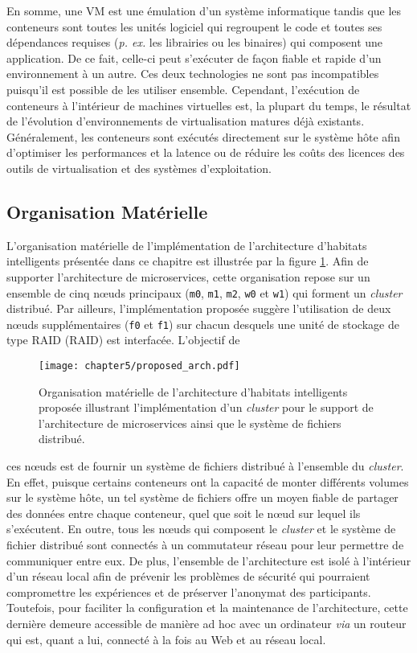 En somme, une \acs{VM} est une émulation d'un système informatique tandis que les conteneurs sont toutes les unités logiciel qui regroupent le code et toutes ses dépendances requises (\textit{p. ex.} les librairies ou les binaires) qui composent une application. De ce fait, celle-ci peut s'exécuter de façon fiable et rapide d'un environnement à un autre. Ces deux technologies ne sont pas incompatibles puisqu'il est possible de les utiliser ensemble. Cependant, l'exécution de conteneurs à l'intérieur de machines virtuelles est, la plupart du temps, le résultat de l'évolution d'environnements de virtualisation matures déjà existants. Généralement, les conteneurs sont exécutés directement sur le système hôte afin d'optimiser les performances et la latence ou de réduire les coûts des licences des outils de virtualisation et des systèmes d'exploitation.

\subsection{Organisation Matérielle}

L'organisation matérielle de l'implémentation de l'architecture d'habitats intelligents présentée dans ce chapitre est illustrée par la figure \ref{fig:proposed_arch}. Afin de supporter l'architecture de microservices, cette organisation repose sur un ensemble de cinq n\oe{}uds principaux (\texttt{m0}, \texttt{m1}, \texttt{m2}, \texttt{w0} et \texttt{w1}) qui forment un \textit{cluster} distribué. Par ailleurs, l'implémentation proposée suggère l'utilisation de deux n\oe{}uds supplémentaires (\texttt{f0} et \texttt{f1}) sur chacun desquels une unité de stockage de type \acs{RAID} (\acl{RAID}) est interfacée. L'objectif de

\begin{figure}[H]
	\centering
	\texttt{[image: chapter5/proposed\_arch.pdf]}
        \caption{Organisation matérielle de l'architecture d'habitats intelligents proposée illustrant l'implémentation d'un \textit{cluster} pour le support de l'architecture de microservices ainsi que le système de fichiers distribué.}
	\label{fig:proposed_arch}
\end{figure}

\noindent ces n\oe{}uds est de fournir un système de fichiers distribué à l'ensemble du \textit{cluster}. En effet, puisque certains conteneurs ont la capacité de monter différents volumes sur le système hôte, un tel système de fichiers offre un moyen fiable de partager des données entre chaque conteneur, quel que soit le n\oe{}ud sur lequel ils s'exécutent. En outre, tous les n\oe{}uds qui composent le \textit{cluster} et le système de fichier distribué sont connectés à un commutateur réseau pour leur permettre de communiquer entre eux. De plus, l'ensemble de l'architecture est isolé à l'intérieur d'un réseau local afin de prévenir les problèmes de sécurité qui pourraient compromettre les expériences et de préserver l'anonymat des participants. Toutefois, pour faciliter la configuration et la maintenance de l'architecture, cette dernière demeure accessible de manière ad hoc avec un ordinateur \textit{via} un routeur qui est, quant a lui, connecté à la fois au Web et au réseau local.

